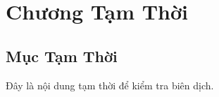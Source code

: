 \documentclass[12pt,oneside,english,doublespacing,nolistspacing,parskip,headsepline]{HUSdissertation}
\author{Tên Sinh Viên}
\begin{document}
	
	\frontmatter
	\pagestyle{plain}
	
	
	
	\mainmatter
	\chapter{Chương Tạm Thời}
	\section{Mục Tạm Thời}
	Đây là nội dung tạm thời để kiểm tra biên dịch.
\end{document}
